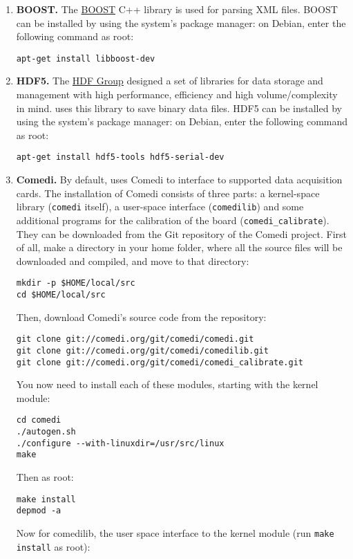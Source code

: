 \begin{enumerate}
\item \textbf{BOOST.}
The \href{http://www.boost.org}{BOOST} C++ library is used for parsing XML files.
BOOST can be installed by using the system's package manager: on Debian, enter the following
command as root:
\begin{lstlisting}
apt-get install libboost-dev
\end{lstlisting}
\item \textbf{HDF5.}
The \href{http://www.hdfgroup.org/HDF5/}{HDF Group} designed a set of
libraries for data storage and management with high performance,
efficiency and high volume/complexity in mind. \textbf{\progname} uses
this library to save binary data files.
HDF5 can be installed by using the system's package manager: on Debian, enter the following
command as root:
\begin{lstlisting}
apt-get install hdf5-tools hdf5-serial-dev
\end{lstlisting}
\item \textbf{Comedi.}
By default, \progname uses Comedi to interface to supported data
acquisition cards. The installation of Comedi consists of three parts:
a kernel-space library (\texttt{comedi} itself), a user-space
interface (\texttt{comedilib}) and some additional programs for the
calibration of the board (\texttt{comedi\_calibrate}). They can be
downloaded from the Git repository of the Comedi project. First of all,
make a directory in your home folder, where all the source files will be downloaded
and compiled, and move to that directory:
\begin{lstlisting}
mkdir -p $HOME/local/src
cd $HOME/local/src
\end{lstlisting}
Then, download Comedi's source code from the repository:
\begin{lstlisting}
git clone git://comedi.org/git/comedi/comedi.git
git clone git://comedi.org/git/comedi/comedilib.git
git clone git://comedi.org/git/comedi/comedi_calibrate.git
\end{lstlisting}
You now need to install each of these modules, starting with the kernel module:
\begin{lstlisting}
cd comedi
./autogen.sh
./configure --with-linuxdir=/usr/src/linux
make
\end{lstlisting}
Then as root:
\begin{lstlisting}
make install
depmod -a
\end{lstlisting}
Now for comedilib, the user space interface to the kernel module (run \texttt{make install} as root):

\end{enumerate}
